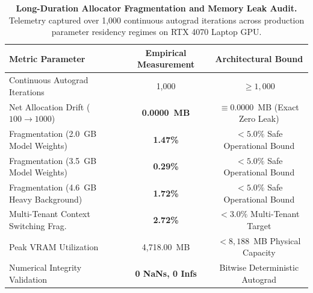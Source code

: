 \begin{table}[h]
\centering
\small
\caption{\textbf{Long-Duration Allocator Fragmentation and Memory Leak Audit.} Telemetry captured over 1,000 continuous autograd iterations across production parameter residency regimes on RTX 4070 Laptop GPU.}
\label{tab:fragmentation_audit}
\begin{tabular}{l c c}
\toprule
Metric Parameter & Empirical Measurement & Architectural Bound \\
\midrule
Continuous Autograd Iterations & 1,000 & $\ge 1,000$ \\
Net Allocation Drift ($100 \to 1000$) & \textbf{0.0000~MB} & $\equiv 0.0000$~MB (Exact Zero Leak) \\
Fragmentation (2.0~GB Model Weights) & \textbf{1.47\%} & $< 5.0\%$ Safe Operational Bound \\
Fragmentation (3.5~GB Model Weights) & \textbf{0.29\%} & $< 5.0\%$ Safe Operational Bound \\
Fragmentation (4.6~GB Heavy Background) & \textbf{1.72\%} & $< 5.0\%$ Safe Operational Bound \\
Multi-Tenant Context Switching Frag. & \textbf{2.72\%} & $< 3.0\%$ Multi-Tenant Target \\
Peak VRAM Utilization & 4,718.00~MB & $< 8,188$~MB Physical Capacity \\
Numerical Integrity Validation & \textbf{0 NaNs, 0 Infs} & Bitwise Deterministic Autograd \\
\bottomrule
\end{tabular}
\end{table}
